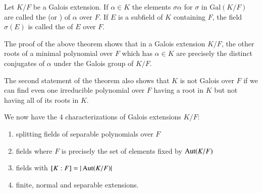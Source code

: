 \documentclass[12pt, a4paper, oneside, openright, titlepage]{book}
\begin{document}
\begin{defn}
    Let $K/F$ be a Galois extension. If $\alpha \in K$ the elements $\sigma \alpha$ for $\sigma$ in $\text{Gal}(K/F)$ are called the  (or ) of $\alpha$ over $F$. If $E$ is a subfield of $K$ containing $F$, the field $\sigma(E)$ is called the  of $E$ over $F$.
\end{defn}


The proof of the above theorem shows that in a Galois extension $K/F$, the other roots of a minimal polynomial over $F$ which has $\alpha \in K$ are precisely the distinct conjugates of $\alpha$ under the Galois group of $K/F$.

The second statement of the theorem also shows that $K$ is not Galois over $F$ if we can find even one irreducible polynomial over $F$ having a root in $K$ but not having all of its roots in $K$.

\begin{rmk}
    We now have the 4 characterizations of Galois extensions $K/F$: \begin{enumerate}
        \item splitting fields of separable polynomials over $F$
        \item fields where $F$ is precisely the set of elements fixed by $\operatorname{Aut}(K/F)$
        \item fields with $[K:F] = |\operatorname{Aut}(K/F)|$
        \item finite, normal and separable extensions.
    \end{enumerate}
\end{rmk}
\end{document}
